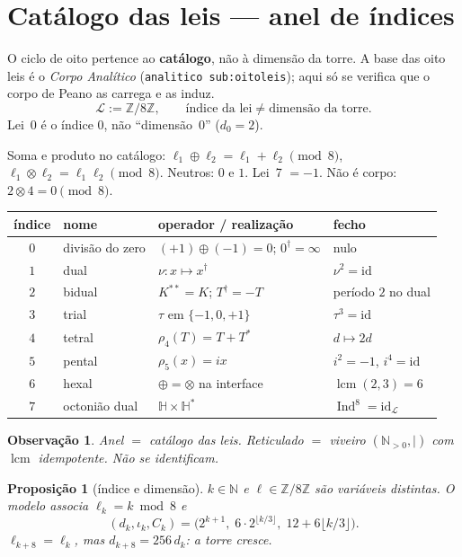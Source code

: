 \documentclass[11pt,a4paper]{article}
\newtheorem{proposicao}{Proposição}
\newtheorem{observacao}{Observação}
\newcommand{\code}[1]{\texttt{#1}}
\begin{document}
\section{Catálogo das leis --- anel de índices}\label{sec:catalogo}

O ciclo de oito pertence ao \textbf{catálogo}, não à dimensão da torre.
A base das oito leis é o \emph{Corpo Analítico} (\code{analitico sub:oitoleis});
aqui só se verifica que o corpo de Peano as carrega e as induz.
\[
\mathcal L:=\mathbb{Z}/8\mathbb{Z},
\qquad
\boxed{\text{índice da lei}\neq\text{dimensão da torre}.}
\]
\label{def:anel}
Lei~0 é o índice $0$, não ``dimensão~$0$'' ($d_0=2$).

Soma e produto no catálogo: $\ell_1\oplus\ell_2=\ell_1+\ell_2\pmod8$,
$\ell_1\otimes\ell_2=\ell_1\ell_2\pmod8$. Neutros: $0$ e $1$.
Lei~7 $=-1$. Não é corpo: $2\otimes4=0\pmod8$.

\begin{center}\small
\begin{tabular}{@{}clll@{}}
índice & nome & operador / realização & fecho \\
\hline
$0$ & divisão do zero & $(+1)\oplus(-1)=0$; $0^{\dagger}=\infty$ & nulo \\
$1$ & dual & $\nu\colon x\mapsto x^{\dagger}$ & $\nu^{2}=\mathrm{id}$ \\
$2$ & bidual & $K^{**}=K$; $T^{\dagger}=-T$ & período $2$ no dual \\
$3$ & trial & $\tau$ em $\{-1,0,+1\}$ & $\tau^{3}=\mathrm{id}$ \\
$4$ & tetral & $\rho_4(T)=T+T^{*}$ & $d\mapsto2d$ \\
$5$ & pental & $\rho_5(x)=ix$ & $i^{2}=-1$, $i^{4}=\mathrm{id}$ \\
$6$ & hexal & $\oplus=\otimes$ na interface & $\operatorname{lcm}(2,3)=6$ \\
$7$ & octonião dual & $\mathbb{H}\times\mathbb{H}^{*}$ & $\operatorname{Ind}^{8}=\mathrm{id}_{\mathcal L}$ \\
\end{tabular}
\end{center}

\begin{observacao}
Anel $=$ catálogo das leis. Reticulado $=$ viveiro
$(\mathbb{N}_{>0},\mid)$ com $\operatorname{lcm}$ idempotente.
Não se identificam.
\end{observacao}

\begin{proposicao}[índice e dimensão]\label{cor:unicidade}
$k\in\mathbb{N}$ e $\ell\in\mathbb{Z}/8\mathbb{Z}$ são variáveis
distintas. O modelo associa $\ell_k=k\bmod8$ e
\[
(d_k,\iota_k,C_k)
=\bigl(2^{k+1},\;6\cdot2^{\lfloor k/3\rfloor},\;
12+6\lfloor k/3\rfloor\bigr).
\]
$\ell_{k+8}=\ell_k$, mas $d_{k+8}=256\,d_k$: a torre cresce.
\end{proposicao}
\end{document}
